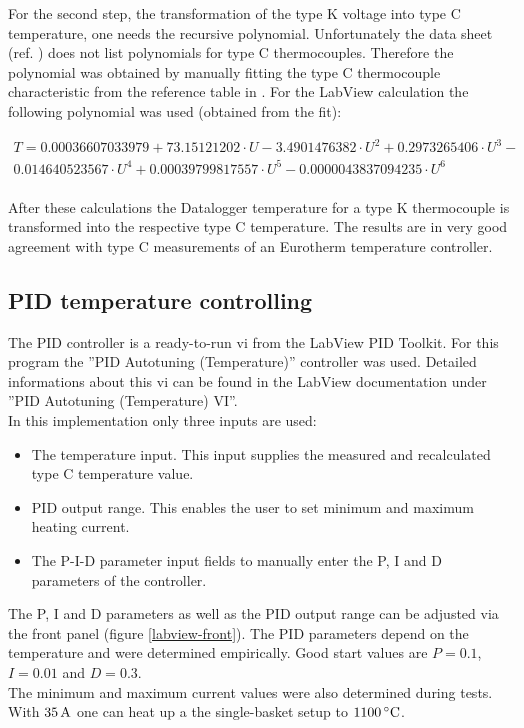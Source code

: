 \documentclass[parskip,12pt,headsepline,a4paper] {scrbook}
\begin{document}
For the second step, the transformation of the type K voltage into type C temperature, one needs the recursive polynomial. Unfortunately the data sheet (ref. \cite{omega-polynomials}) does not list polynomials for type C thermocouples. Therefore the polynomial was obtained by manually fitting the type C thermocouple characteristic from the reference table in \cite{ref-typec}. For the LabView calculation the following polynomial was used (obtained from the fit):

\begin{multline}  \label{fit-polynomial}
T = 0.00036607033979 + 73.15121202 \cdot U - 3.4901476382 \cdot U^2 + 0.2973265406 \cdot U^3 - \\
    0.014640523567 \cdot U^4 + 0.00039799817557 \cdot U^5 - 0.0000043837094235 \cdot U^6 \\
\end{multline}

After these calculations the Datalogger temperature for a type K thermocouple is transformed into the respective type C temperature. The results are in very good agreement with type C measurements of an Eurotherm temperature controller.

\subsection{PID temperature controlling}
\vspace{-1\baselineskip}
The PID controller is a ready-to-run vi from the LabView PID Toolkit. For this program the ''PID Autotuning (Temperature)'' controller was used. Detailed informations about this vi can be found in the LabView documentation under ''PID Autotuning (Temperature) VI''. \\
In this implementation only three inputs are used:

\begin{itemize}
\item The temperature input. This input supplies the measured and recalculated type C temperature value.
\item PID output range. This enables the user to set minimum and maximum heating current.
\item The P-I-D parameter input fields to manually enter the P, I and D parameters of the controller.
\end{itemize}

The P, I and D parameters as well as the PID output range can be adjusted via the front panel (figure \ref{labview-front}). The PID parameters depend on the temperature and were determined empirically. Good start values are $P = 0.1$, $I = 0.01$ and $D = 0.3$. \\
The minimum and maximum current values were also determined during tests. With $\unit[35]{A}$ one can heat up a the single-basket setup to $\unit[1100]{^\circ C}$.
\end{document}
